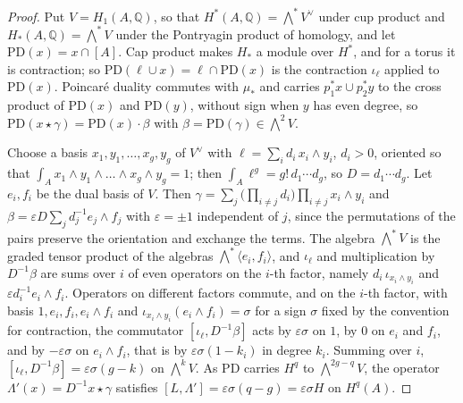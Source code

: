 \documentclass[11pt,reqno]{amsart}
\theoremstyle{plain}
\theoremstyle{definition}
\theoremstyle{remark}
\newcommand{\QQ}{\mathbb{Q}}
\begin{document}
\begin{proof}
Put $V=H_{1}(A,\QQ)$, so that $H^{*}(A,\QQ)=\bigwedge^{*}V^{\vee}$ under cup
product and $H_{*}(A,\QQ)=\bigwedge^{*}V$ under the Pontryagin product of
homology, and let $\mathrm{PD}(x)=x\cap[A]$. Cap product makes
$H_{*}$ a module over $H^{*}$, and for a torus it is contraction; so
$\mathrm{PD}(\ell\cup x)=\ell\cap\mathrm{PD}(x)$ is the contraction
$\iota_{\ell}$ applied to $\mathrm{PD}(x)$. Poincar\'e duality commutes
with $\mu_{*}$ and carries $p_{1}^{*}x\cup p_{2}^{*}y$ to the cross product
of $\mathrm{PD}(x)$ and $\mathrm{PD}(y)$, without sign when $y$ has even
degree, so $\mathrm{PD}(x\star\gamma)=\mathrm{PD}(x)\cdot\beta$ with
$\beta=\mathrm{PD}(\gamma)\in\bigwedge^{2}V$.

Choose a basis $x_{1},y_{1},\dots,x_{g},y_{g}$ of $V^{\vee}$ with
$\ell=\sum_{i}d_{i}\,x_{i}\wedge y_{i}$, $d_{i}>0$, oriented so that
$\int_{A}x_{1}\wedge y_{1}\wedge\dots\wedge x_{g}\wedge y_{g}=1$; then
$\int_{A}\ell^{g}=g!\,d_{1}\cdots d_{g}$, so $D=d_{1}\cdots d_{g}$. Let
$e_{i},f_{i}$ be the dual basis of $V$. Then
$\gamma=\sum_{j}\bigl(\prod_{i\ne j}d_{i}\bigr)\prod_{i\ne j}x_{i}\wedge y_{i}$
and $\beta=\varepsilon D\sum_{j}d_{j}^{-1}e_{j}\wedge f_{j}$ with
$\varepsilon=\pm1$ independent of $j$, since the permutations of the pairs
preserve the orientation and exchange the terms. The algebra $\bigwedge^{*}V$
is the graded tensor product of the algebras
$\bigwedge^{*}\langle e_{i},f_{i}\rangle$, and $\iota_{\ell}$ and
multiplication by $D^{-1}\beta$ are sums over $i$ of even operators on the
$i$-th factor, namely $d_{i}\,\iota_{x_{i}\wedge y_{i}}$ and
$\varepsilon d_{i}^{-1}e_{i}\wedge f_{i}$. Operators on different factors
commute, and on the $i$-th factor, with basis $1,e_{i},f_{i},e_{i}\wedge
f_{i}$ and $\iota_{x_{i}\wedge y_{i}}(e_{i}\wedge f_{i})=\sigma$ for a sign
$\sigma$ fixed by the convention for contraction, the commutator
$[\iota_{\ell},D^{-1}\beta]$ acts by $\varepsilon\sigma$ on $1$, by $0$ on
$e_{i}$ and $f_{i}$, and by $-\varepsilon\sigma$ on $e_{i}\wedge f_{i}$, that
is by $\varepsilon\sigma(1-k_{i})$ in degree $k_{i}$. Summing over $i$,
$[\iota_{\ell},D^{-1}\beta]=\varepsilon\sigma(g-k)$ on $\bigwedge^{k}V$. As
$\mathrm{PD}$ carries $H^{q}$ to $\bigwedge^{2g-q}V$, the operator
$\Lambda'(x)=D^{-1}x\star\gamma$ satisfies
$[L,\Lambda']=\varepsilon\sigma(q-g)=\varepsilon\sigma H$ on $H^{q}(A)$.


\end{proof}
\end{document}

